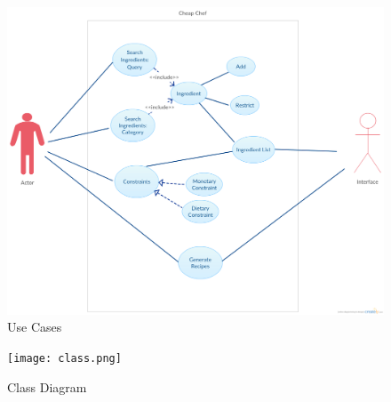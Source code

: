 \documentclass[12pt]{article}
\begin{document}
\begin{figure}
  \includegraphics[width=\linewidth]{usecases.png}
  \caption{Use Cases}
  \label{fig: usecases}
\end{figure}

\begin{center}
  \begin{figure}
    \texttt{[image: class.png]}
    \caption{Class Diagram}
    \label{fig: class}
  \end{figure}
\end{center}
\end{document}
